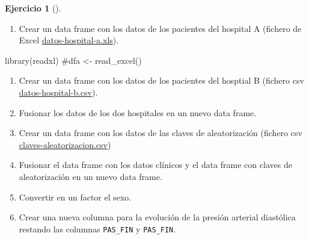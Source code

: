 \documentclass[
  a4paper,
]{scrreport}
\newenvironment{Shaded}{\begin{snugshade}}{\end{snugshade}}
\newcommand{\CommentTok}[1]{\textcolor[rgb]{0.37,0.37,0.37}{#1}}
\newcommand{\FunctionTok}[1]{\textcolor[rgb]{0.28,0.35,0.67}{#1}}
\newcommand{\NormalTok}[1]{\textcolor[rgb]{0.00,0.23,0.31}{#1}}
\providecommand{\tightlist}{%
  \setlength{\itemsep}{0pt}\setlength{\parskip}{0pt}}\usepackage{longtable,booktabs,array}
\theoremstyle{definition}
\newtheorem{exercise}{Ejercicio}[chapter]
\theoremstyle{remark}
\begin{document}
\begin{exercise}[]
\begin{enumerate}
\def\labelenumi{\alph{enumi}.}
\tightlist
\item
  Crear un data frame con los datos de los pacientes del hospital A
  (fichero de Excel
  \href{datos/hipertension/datos-hospital-a.xls}{datos-hospital-a.xls}).
\end{enumerate}

\begin{tcolorbox}[enhanced jigsaw, title=\textcolor{quarto-callout-tip-color}{\faLightbulb}\hspace{0.5em}{Solución}, coltitle=black, opacitybacktitle=0.6, rightrule=.15mm, colback=white, bottomtitle=1mm, breakable, leftrule=.75mm, opacityback=0, colbacktitle=quarto-callout-tip-color!10!white, left=2mm, colframe=quarto-callout-tip-color-frame, toptitle=1mm, titlerule=0mm, arc=.35mm, bottomrule=.15mm, toprule=.15mm]

\begin{Shaded}
\begin{Highlighting}[]
\FunctionTok{library}\NormalTok{(readxl)}
\CommentTok{\#dfa \textless{}{-} read\_excel()}
\end{Highlighting}
\end{Shaded}

\end{tcolorbox}

\begin{enumerate}
\def\labelenumi{\alph{enumi}.}
\setcounter{enumi}{1}
\item
  Crear un data frame con los datos de los pacientes del hosptial B
  (fichero csv
  \href{datos/hipertension/datos-hospital-b.csv}{datos-hospital-b.csv}).
\item
  Fusionar los datos de los dos hospitales en un nuevo data frame.
\item
  Crear un data frame con los datos de las claves de aleatorización
  (fichero csv
  \href{datos/hipertension/claves-aleatorizacion.csv}{claves-aleatorizacion.csv})
\item
  Fusionar el data frame con los datos clínicos y el data frame con
  claves de aleatorización en un nuevo data frame.
\item
  Convertir en un factor el sexo.
\item
  Crear una nueva columna para la evolución de la presión arterial
  diastólica restando las columnas \texttt{PAS\_FIN} y
  \texttt{PAS\_FIN}.
\end{enumerate}

\end{exercise}
\end{document}
